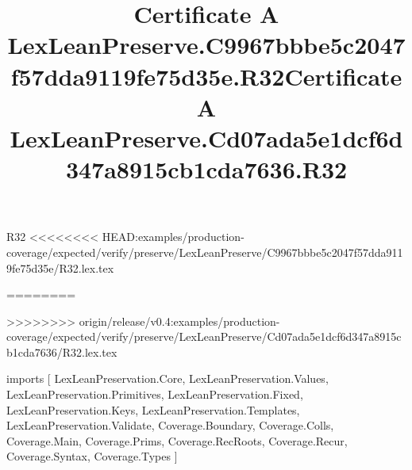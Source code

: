 \begin{lexlean}{R32}
<<<<<<<< HEAD:examples/production-coverage/expected/verify/preserve/LexLeanPreserve/C9967bbbe5c2047f57dda9119fe75d35e/R32.lex.tex
\title{Certificate A LexLeanPreserve.C9967bbbe5c2047f57dda9119fe75d35e.R32}
========
\title{Certificate A LexLeanPreserve.Cd07ada5e1dcf6d347a8915cb1cda7636.R32}
>>>>>>>> origin/release/v0.4:examples/production-coverage/expected/verify/preserve/LexLeanPreserve/Cd07ada5e1dcf6d347a8915cb1cda7636/R32.lex.tex
\begin{coremodule}
imports [
  LexLeanPreservation.Core,
  LexLeanPreservation.Values,
  LexLeanPreservation.Primitives,
  LexLeanPreservation.Fixed,
  LexLeanPreservation.Keys,
  LexLeanPreservation.Templates,
  LexLeanPreservation.Validate,
  Coverage.Boundary,
  Coverage.Colls,
  Coverage.Main,
  Coverage.Prims,
  Coverage.RecRoots,
  Coverage.Recur,
  Coverage.Syntax,
  Coverage.Types
]


\end{coremodule}
\end{lexlean}
